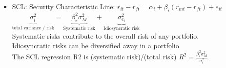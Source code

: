 \documentclass[10pt,landscape]{article}
\begin{document}
\begin{multicols}{2}
\begin{itemize}
        \item SCL: Security Characteristic Line: {\color{red}$r_{i t}-r_{f t}=\alpha_{i}+\beta_{i}\left(r_{m t}-r_{f t}\right)+e_{i t}$}\\
            $ \underbrace{\sigma_{i}^{2}}_{\text{total variance / risk}}= 
            \underbrace{\beta_{i}^{2} \sigma_{M}^{2}}_{\text{Systematic risk}}+
            \underbrace{\sigma_{e_{i}}^{2}}_{\text{Idiosyncratic risk}}$\\
            Systematic risks contribute to the overall risk of any portfolio.\\
            Idiosyncratic risks can be diversified away in a portfolio\\
            The SCL regression R2 is (systematic risk)/(total risk) $\displaystyle R^{2}=\frac{\beta_{i}^{2} \sigma_{M}^{2}}{\sigma_{i}^{2}}$
    \end{itemize}


\end{multicols}
\end{document}
